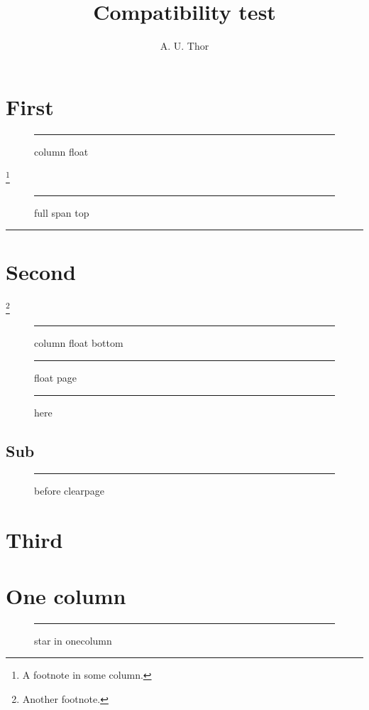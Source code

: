 \documentclass[twocolumn]{article}
\title{Compatibility test}\author{A. U. Thor}\date{}
\begin{document}
\maketitle
\begin{abstract}\lipsum[1][1-4]\end{abstract}
\section{First}
\lipsum[1-3]
\begin{figure}[t]\centering\rule{.8\linewidth}{2cm}\caption{column float}\end{figure}
\lipsum[5-7]\footnote{A footnote in some column.}
\begin{figure}[t]\centering\rule{.8\linewidth}{3cm}\caption{full span top}\end{figure}
\begin{table}\centering\rule{.6\linewidth}{2cm}\caption{default table star}\end{table}
\section{Second}
\lipsum[8-12]\footnote{Another footnote.}
\begin{figure}[b]\centering\rule{.8\linewidth}{2cm}\caption{column float bottom}\end{figure}
\begin{figure}[p]\centering\rule{.8\linewidth}{12cm}\caption{float page}\end{figure}
\lipsum[13-22]
\begin{figure}[htbp]\centering\rule{.8\linewidth}{1cm}\caption{here}\end{figure}
\subsection{Sub}
\lipsum[23-30]
\begin{figure}[t]\centering\rule{.8\linewidth}{3cm}\caption{before clearpage}\end{figure}
\lipsum[31]
\clearpage
\section{Third}
\lipsum[32-36]
\lipsum[37-45]
\enlargethispage{2\baselineskip}
\lipsum[46-52]
\lipsum[53-56]
\onecolumn
\section{One column}
\lipsum[1-3]
\begin{figure}[t]\centering\rule{.8\linewidth}{3cm}\caption{star in onecolumn}\end{figure}
\twocolumn
\lipsum[4-12]
\end{document}
